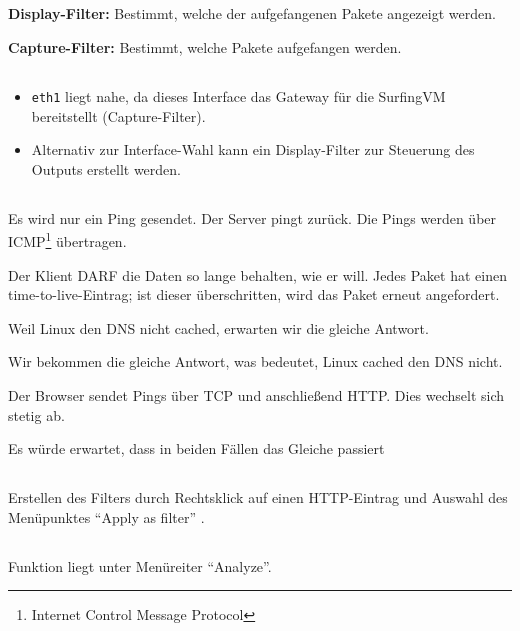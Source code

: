 \documentclass[twoside]{article}
\newcommand{\say}[1]{%
	``#1''%
}
\newcommand{\ttt}[1]{%
	\texttt{#1}%
}
\begin{document}
\subsection{}
\begin{minipage}[t]{0.48\textwidth}
\textbf{Display-Filter:}
Bestimmt, welche der aufgefangenen Pakete angezeigt werden.
\end{minipage}
\begin{minipage}[t]{0.48\textwidth}
\textbf{Capture-Filter:}
Bestimmt, welche Pakete aufgefangen werden.
\end{minipage}
\setcounter{subsection}{3}
\subsection{}
\begin{itemize}
	\item \ttt{eth1} liegt nahe, da dieses Interface das Gateway für die SurfingVM bereitstellt (Capture-Filter).
	\item Alternativ zur Interface-Wahl kann ein Display-Filter zur Steuerung des Outputs erstellt werden.
\end{itemize}
\subsection{}
Es wird nur ein Ping gesendet.
Der Server pingt zurück.
Die Pings werden über ICMP\footnote{Internet Control Message Protocol} übertragen.

Der Klient DARF die Daten so lange behalten, wie er will.
Jedes Paket hat einen time-to-live-Eintrag; ist dieser überschritten, wird das Paket erneut angefordert.

Weil Linux den DNS nicht cached, erwarten wir die gleiche Antwort.

Wir bekommen die gleiche Antwort, was bedeutet, Linux cached den DNS nicht.

Der Browser sendet Pings über TCP und anschließend HTTP.
Dies wechselt sich stetig ab.

Es würde erwartet, dass in beiden Fällen das Gleiche passiert
\subsection{}
Erstellen des Filters durch Rechtsklick auf einen HTTP-Eintrag und Auswahl des Menüpunktes \say{Apply as filter}.
\subsection{}
Funktion liegt unter Menüreiter ``Analyze''.
\end{document}
